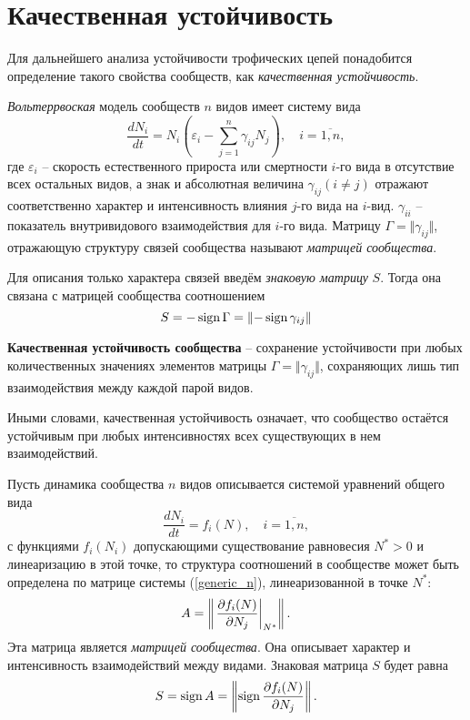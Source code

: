 \section{Качественная устойчивость}
    Для дальнейшего анализа устойчивости трофических цепей понадобится определение такого свойства сообществ, как \textit{качественная устойчивость}.

    \textit{Вольтеррвоская} модель сообществ \(n\) видов имеет систему вида
    \begin{equation}
        \frac{d N_i}{d t} = N_i \left( \varepsilon_i - \sum_{j=1}^{n} \gamma_{ij} N_j \right), \quad i=\overline{1,n},
    \end{equation}
    где \(\varepsilon_i\) -- скорость естественного прироста или смертности \(i\)-го вида в отсутствие всех остальных видов, а знак и абсолютная величина \(\gamma_{ij} (i \neq j)\) отражают соответственно характер и интенсивность влияния \(j\)-го вида на \(i\)-вид. \(\gamma_{ii}\) -- показатель внутривидового взаимодействия для \(i\)-го вида. Матрицу \(\Gamma = \Vert \gamma_{ij} \Vert\), отражающую структуру связей сообщества называют \textit{матрицей сообщества}.

    Для описания только характера связей введём \textit{знаковую матрицу} \(S\). Тогда она связана с матрицей сообщества соотношением 
    \[
        S = -\operatorname{sign} \Gamma = \left\Vert - \operatorname{sign} \gamma_{ij} \right\Vert
    \]

    \begin{definition}
        \textbf{Качественная устойчивость сообщества} -- сохранение устойчивости при любых количественных значениях элементов матрицы \(\Gamma = \Vert \gamma_{ij} \Vert\), сохраняющих лишь тип взаимодействия между каждой парой видов.
    \end{definition}

    Иными словами, качественная устойчивость означает, что сообщество остаётся устойчивым при любых интенсивностях  всех существующих в нем взаимодействий.

    Пусть динамика сообщества \(n\) видов описывается системой уравнений общего вида
    \begin{equation} \label{generic_n}
        \frac{d N_i}{d t} = f_i(N), \quad i = \overline{1,n},
    \end{equation}
    с функциями \(f_i (N_i)\) допускающими существование равновесия \(N^* > 0\) и линеаризацию в этой точке, то структура соотношений в сообществе может быть определена по матрице системы (\ref{generic_n}), линеаризованной в точке \(N^*\):
    \begin{equation}
        A = \left\Vert \left. \frac{\partial f_i (N)}{\partial N_j} \right|_{N^*} \right\Vert.
    \end{equation}
    Эта матрица является \textit{матрицей сообщества}. Она описывает характер и интенсивность взаимодействий между видами. Знаковая матрица \(S\) будет равна
    \begin{equation} \label{sign_partial}
        S = \operatorname{sign} A = \left\Vert \operatorname{sign} \frac{\partial f_i (N)}{\partial N_j} \right\Vert.
    \end{equation}

